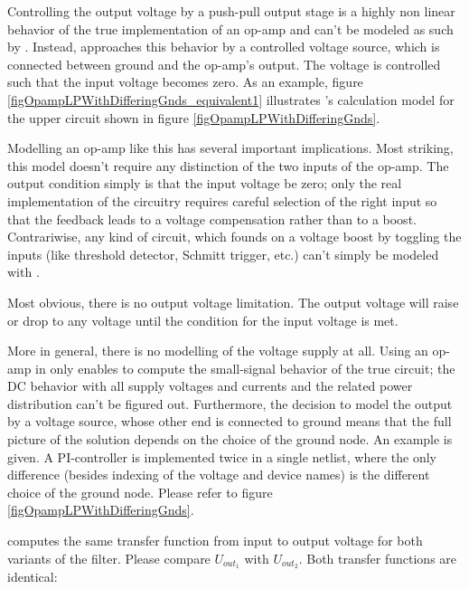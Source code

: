 Controlling the output voltage by a push-pull output stage is a highly non
linear behavior of the true implementation of an op-amp and can't be
modeled as such by \linnet{}. Instead, \linnet{} approaches this behavior
by a controlled voltage source, which is connected between ground and the
op-amp's output. The voltage is controlled such that the input voltage
becomes zero. As an example, figure
\ref{figOpampLPWithDifferingGnds_equivalent1} illustrates \linnet's
calculation model for the upper circuit shown in figure
\ref{figOpampLPWithDifferingGnds}.

Modelling an op-amp like this has several important implications. Most
striking, this model doesn't require any distinction of the two inputs of
the op-amp. The output condition simply is that the input voltage be zero;
only the real implementation of the circuitry requires careful selection
of the right input so that the feedback leads to a voltage compensation
rather than to a boost. Contrariwise, any kind of circuit, which founds on
a voltage boost by toggling the inputs (like threshold detector, Schmitt
trigger, etc.) can't simply be modeled with \linnet{}.

Most obvious, there is no output voltage limitation. The output voltage
will raise or drop to any voltage until the condition for the input
voltage is met.

More in general, there is no modelling of the voltage supply at all. Using
an op-amp in \linnet{} only enables to compute the small-signal behavior
of the true circuit; the DC behavior with all supply voltages and currents
and the related power distribution can't be figured out. Furthermore, the
decision to model the output by a voltage source, whose other end is
connected to ground means that the full picture of the solution depends on
the choice of the ground node. An example is given. A PI-controller is
implemented twice in a single netlist, where the only difference (besides
indexing of the voltage and device names) is the different choice of the
ground node. Please refer to figure \ref{figOpampLPWithDifferingGnds}.

\linnet{} computes the same transfer function from input to output voltage
for both variants of the filter. Please compare $U_{out_1}$ with
$U_{out_2}$. Both transfer functions are identical:

